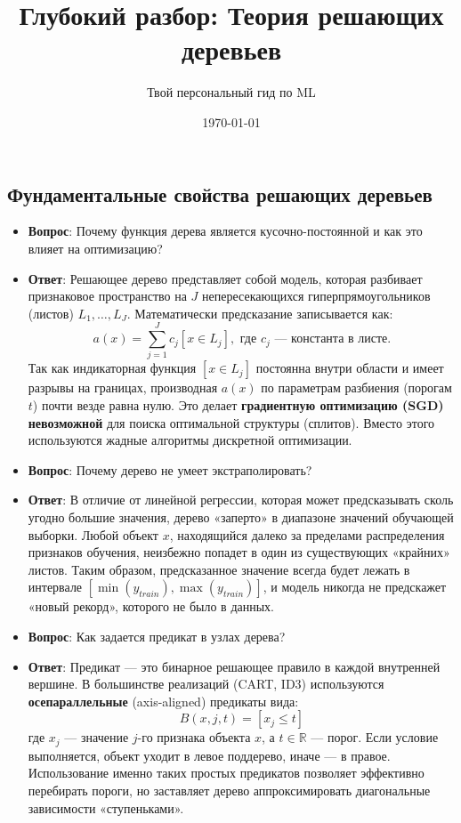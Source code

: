 \documentclass[12pt]{article}
\title{Глубокий разбор: Теория решающих деревьев}
\author{Твой персональный гид по ML}
\date{\today}
\begin{document}
\subsection{Фундаментальные свойства решающих деревьев}

\begin{itemize}
    \item \textbf{Вопрос}: Почему функция дерева является кусочно-постоянной и как это влияет на оптимизацию?
    \item \textbf{Ответ}: Решающее дерево представляет собой модель, которая разбивает признаковое пространство на $J$ непересекающихся гиперпрямоугольников (листов) $L_1, \dots, L_J$. Математически предсказание записывается как:
    \[ a(x) = \sum_{j=1}^J c_j [x \in L_j], \text{ где } c_j \text{ — константа в листе.} \]
    Так как индикаторная функция $[x \in L_j]$ постоянна внутри области и имеет разрывы на границах, производная $a(x)$ по параметрам разбиения (порогам $t$) почти везде равна нулю. Это делает \textbf{градиентную оптимизацию (SGD) невозможной} для поиска оптимальной структуры (сплитов). Вместо этого используются жадные алгоритмы дискретной оптимизации.

    \item \textbf{Вопрос}: Почему дерево не умеет экстраполировать?
    \item \textbf{Ответ}: В отличие от линейной регрессии, которая может предсказывать сколь угодно большие значения, дерево «заперто» в диапазоне значений обучающей выборки. Любой объект $x$, находящийся далеко за пределами распределения признаков обучения, неизбежно попадет в один из существующих «крайних» листов. Таким образом, предсказанное значение всегда будет лежать в интервале $[\min(y_{train}), \max(y_{train})]$, и модель никогда не предскажет «новый рекорд», которого не было в данных.

    \item \textbf{Вопрос}: Как задается предикат в узлах дерева?
    \item \textbf{Ответ}: Предикат — это бинарное решающее правило в каждой внутренней вершине. В большинстве реализаций (CART, ID3) используются \textbf{осепараллельные} (axis-aligned) предикаты вида:
    \[ B(x, j, t) = [x_j \le t] \]
    где $x_j$ — значение $j$-го признака объекта $x$, а $t \in \mathbb{R}$ — порог. Если условие выполняется, объект уходит в левое поддерево, иначе — в правое. Использование именно таких простых предикатов позволяет эффективно перебирать пороги, но заставляет дерево аппроксимировать диагональные зависимости «ступеньками».
\end{itemize}
\end{document}
